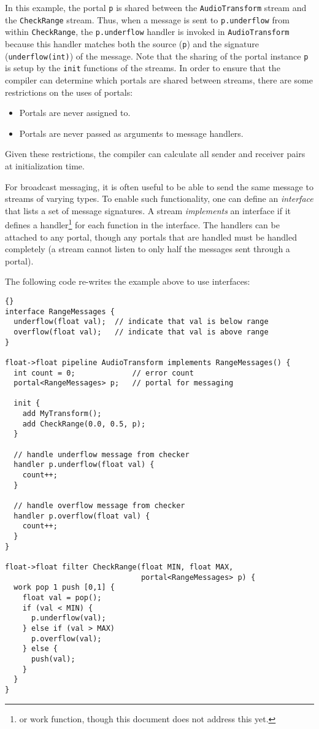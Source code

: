 In this example, the portal {\tt p} is shared between the
\lstinline|AudioTransform| stream and the \lstinline|CheckRange|
stream.  Thus, when a message is sent to {\tt p.underflow} from within
\lstinline|CheckRange|, the {\tt p.underflow} handler is invoked in
\lstinline|AudioTransform| because this handler matches both the
source ({\tt p}) and the signature ({\tt underflow(int)}) of the
message.  Note that the sharing of the portal instance {\tt p} is
setup by the {\tt init} functions of the streams.  In order to ensure
that the compiler can determine which portals are shared between
streams, there are some restrictions on the uses of portals:

\begin{itemize}
\item Portals are never assigned to.
\item Portals are never passed as arguments to message handlers.
\end{itemize}

\noindent Given these restrictions, the compiler can calculate all
sender and receiver pairs at initialization time.

For broadcast messaging, it is often useful to be able to send the
same message to streams of varying types.  To enable such
functionality, one can define an {\it interface} that lists a set of
message signatures.  A stream {\it implements} an interface if it
defines a handler\footnote{or work function, though this document does
not address this yet.} for each function in the interface.  The
handlers can be attached to any portal, though any portals that are
handled must be handled completely (a stream cannot listen to only
half the messages sent through a portal).

The following code re-writes the example above to use interfaces:

\begin{lstlisting}{}
interface RangeMessages {
  underflow(float val);  // indicate that val is below range
  overflow(float val);   // indicate that val is above range
}

float->float pipeline AudioTransform implements RangeMessages() {
  int count = 0;             // error count
  portal<RangeMessages> p;   // portal for messaging

  init {
    add MyTransform();
    add CheckRange(0.0, 0.5, p);
  }

  // handle underflow message from checker
  handler p.underflow(float val) {
    count++;
  }

  // handle overflow message from checker
  handler p.overflow(float val) {
    count++;
  }
}

float->float filter CheckRange(float MIN, float MAX,
                               portal<RangeMessages> p) {
  work pop 1 push [0,1] {
    float val = pop();
    if (val < MIN) {
      p.underflow(val);
    } else if (val > MAX)
      p.overflow(val);
    } else {
      push(val);
    }
  }
}
\end{lstlisting}{}

